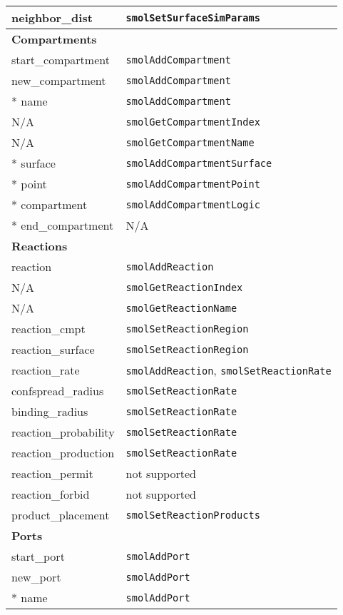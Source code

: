 \documentclass {book}
\begin{document}
\begin{longtable}[c]{ll}
neighbor\_dist & \texttt{smolSetSurfaceSimParams}\\
\hline
\multicolumn{2}{l}{\hspace{0.3in}\textbf{Compartments}}\\
\hline
start\_compartment & \texttt{smolAddCompartment}\\
new\_compartment & \texttt{smolAddCompartment}\\
{*} name & \texttt{smolAddCompartment}\\
N/A & \texttt{smolGetCompartmentIndex}\\
N/A & \texttt{smolGetCompartmentName}\\
{*} surface & \texttt{smolAddCompartmentSurface}\\
{*} point & \texttt{smolAddCompartmentPoint}\\
{*} compartment & \texttt{smolAddCompartmentLogic}\\
{*} end\_compartment & N/A\\
\hline
\multicolumn{2}{l}{\hspace{0.3in}\textbf{Reactions}}\\
\hline
reaction & \texttt{smolAddReaction}\\
N/A & \texttt{smolGetReactionIndex}\\
N/A & \texttt{smolGetReactionName}\\
reaction\_cmpt & \texttt{smolSetReactionRegion}\\
reaction\_surface & \texttt{smolSetReactionRegion}\\
reaction\_rate & \texttt{smolAddReaction}, \texttt{smolSetReactionRate}\\
confspread\_radius & \texttt{smolSetReactionRate}\\
binding\_radius & \texttt{smolSetReactionRate}\\
reaction\_probability & \texttt{smolSetReactionRate}\\
reaction\_production & \texttt{smolSetReactionRate}\\
reaction\_permit & not supported\\
reaction\_forbid & not supported\\
product\_placement & \texttt{smolSetReactionProducts}\\
\hline
\multicolumn{2}{l}{\hspace{0.3in}\textbf{Ports}}\\
\hline
start\_port & \texttt{smolAddPort}\\
new\_port & \texttt{smolAddPort}\\
{*} name & \texttt{smolAddPort}\\

\end{longtable}
\end{document}

